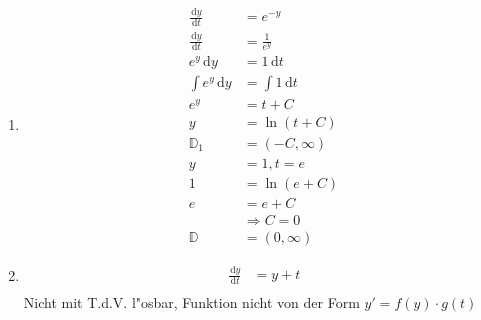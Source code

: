 \documentclass[fleqn,12pt]{scrartcl}
\newcommand{\id}{\, \mathrm{d}}
\newcommand{\abl}[2]{
	\frac{\id #1}{\id #2}
}
\begin{document}
\begin{enumerate}
\begin{enumerate}[label=\arabic*.]
	\item
		\begin{align*}
			\abl yt &= e^{-y}\\
			\abl yt &= \frac{1}{e^{y}}\\
			e^y \id y &= 1 \id t\\
			\int e^y \id y &= \int 1 \id t\\
			e^y &= t+C \\
			y &= \ln (t+C) \\
			\mathbb{D}_1 &= (-C, \infty)\\
			y &= 1, t = e\\
			1 &= \ln (e + C)\\
			e &= e + C\\
				&\Rightarrow C=0\\
			\mathbb{D} &= (0, \infty)
		\end{align*}
		
	\item
		\begin{align*}
			\abl yt &= y + t\\
		\end{align*}
		Nicht mit T.d.V. l"osbar, Funktion nicht von der Form $y' = f(y) \cdot g(t)$
\end{enumerate}

\end{enumerate}
\end{document}
